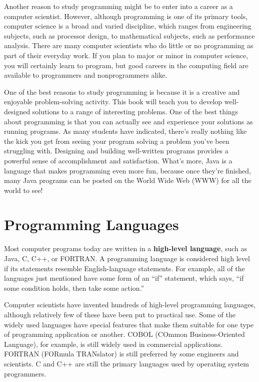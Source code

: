 Another reason to study programming might be to enter into a career as
a computer scientist.  However, although programming is one of its
primary tools, computer science is a broad and varied discipline,
which ranges from engineering subjects, such as processor design, to
mathematical subjects, such as performance analysis.  There are many
computer scientists who do little or no programming as part of their
everyday work.  If you plan to major or minor in computer science, you
will certainly learn to program, but good careers in the computing
field are available to programmers and nonprogrammers alike.

One of the best reasons to study programming is because it is a
creative and enjoyable problem-solving activity.  This book will teach
you to develop well-designed solutions to a range of interesting
problems.  One of the best things about programming is that you can
actually see and experience your solutions as running programs.  As
many students have indicated, there's really nothing like the kick you
get from seeing your program solving a problem you've been struggling
with.  Designing and building well-written programs provides a
powerful sense of accomplishment and satisfaction.  What's more, Java
is a language that makes programming even more fun, because once
they're finished, many Java programs can be posted on the World Wide
Web (WWW) for all the world to see!



\section{Programming Languages}
\noindent Most computer programs today are written in a {\bf high-level
language}, such as Java, C, C++, or
FORTRAN. A programming language is considered high level if its
statements resemble English-language statements.  For example, all of
the languages just mentioned have some form of an ``if'' statement,
which says, ``if some condition holds, then take some action.''

Computer scientists have invented hundreds of high-level programming
languages, although relatively few of these have been put to practical
use.  Some of the widely used languages have special features that
make them suitable for one type of programming application or another.
COBOL (COmmon Business-Oriented Language), for example, is still
widely used in commercial applications.  FORTRAN (FORmula TRANslator)
is still preferred by some engineers and scientists.  C and C++ are
still the primary languages used by operating system programmers.

